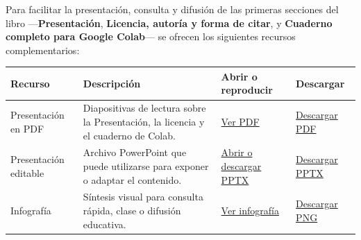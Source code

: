 \documentclass[
  spanish,
  10.5pt,
  letterpaper,
  openany,
  headings=big]{scrbook}
\newcounter{none} %
\begin{document}

Para facilitar la presentación, consulta y difusión de las primeras
secciones del libro ---\textbf{Presentación}, \textbf{Licencia, autoría
y forma de citar}, y \textbf{Cuaderno completo para Google Colab}--- se
ofrecen los siguientes recursos complementarios:

{\def\LTcaptype{none} %
\begin{longtable}[]{@{}
  >{\raggedright\arraybackslash}p{}
  >{\raggedright\arraybackslash}p{}
  >{\raggedright\arraybackslash}p{}
  >{\raggedright\arraybackslash}p{}@{}}
\toprule\noalign{}
\begin{minipage}[b]{\linewidth}\raggedright
Recurso
\end{minipage} & \begin{minipage}[b]{\linewidth}\raggedright
Descripción
\end{minipage} & \begin{minipage}[b]{\linewidth}\raggedright
Abrir o reproducir
\end{minipage} & \begin{minipage}[b]{\linewidth}\raggedright
Descargar
\end{minipage} \\
\midrule\noalign{}
\endhead
\bottomrule\noalign{}
\endlastfoot
Presentación en PDF & Diapositivas de lectura sobre la Presentación, la
licencia y el cuaderno de Colab. &
\href{recursos/presentacion-licencia-cuaderno.pdf}{Ver PDF} &
\href{recursos/presentacion-licencia-cuaderno.pdf}{Descargar PDF} \\
Presentación editable & Archivo PowerPoint que puede utilizarse para
exponer o adaptar el contenido. &
\href{recursos/presentacion-licencia-cuaderno.pptx}{Abrir o descargar
PPTX} & \href{recursos/presentacion-licencia-cuaderno.pptx}{Descargar
PPTX} \\
Infografía & Síntesis visual para consulta rápida, clase o difusión
educativa. &
\href{recursos/infografia-presentacion-licencia-cuaderno.png}{Ver
infografía} &
\href{recursos/infografia-presentacion-licencia-cuaderno.png}{Descargar
PNG} \\
\end{longtable}
}
\end{document}
